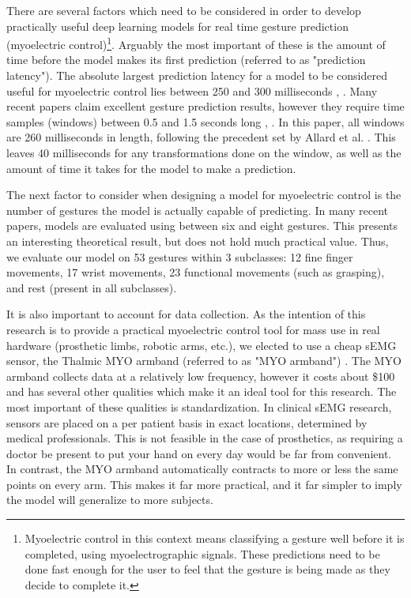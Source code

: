 \documentclass{llncs}
\begin{document}

There are several factors which need to be considered in order to develop practically useful deep learning models for real time gesture prediction (myoelectric control)\footnote{Myoelectric control in this context means classifying a gesture well before it is completed, using myoelectrographic signals. These predictions need to be done fast enough for the user to feel that the gesture is being made as they decide to complete it.}. Arguably the most important of these is the amount of time before the model makes its first prediction (referred to as "prediction latency"). 
The absolute largest prediction latency for a model to be considered useful for myoelectric control lies between 250 and 300 milliseconds  \cite{300ms}, \cite{250ms}. Many recent papers claim excellent gesture prediction results, however they require time samples (windows) between 0.5 and 1.5 seconds long \cite{rnn_1000}, \cite{rnn_128}. In this paper, all windows are 260 milliseconds in length, following the precedent set by Allard et al. \cite{primary}. This leaves 40 milliseconds for any transformations done on the window, as well as the amount of time it takes for the model to make a prediction.


The next factor to consider when designing a model for myoelectric control is the number of gestures the model is actually capable of predicting. In many recent papers, models are evaluated using between six and eight gestures. This presents an interesting theoretical result, but does not hold much practical value. Thus, we evaluate our model on 53 gestures within 3 subclasses: 12 fine finger movements, 17 wrist movements, 23 functional movements (such as grasping), and rest (present in all subclasses). 

It is also important to account for data collection. As the intention of this research is to provide a practical myoelectric control tool for mass use in real hardware (prosthetic limbs, robotic arms, etc.), we elected to use a cheap sEMG sensor, the Thalmic MYO armband (referred to as "MYO armband") \cite{myo}. The MYO armband collects data at a relatively low frequency, however it costs about \$100 and has several other qualities which make it an ideal tool for this research. The most important of these qualities is standardization. In clinical sEMG research, sensors are placed on a per patient basis in exact locations, determined by medical professionals. This is not feasible in the case of prosthetics, as requiring a doctor be present to put your hand on every day would be far from convenient. In contrast, the MYO armband automatically contracts to more or less the same points on every arm. This makes it far more practical, and it far simpler to imply the model will generalize to more subjects.
\end{document}
